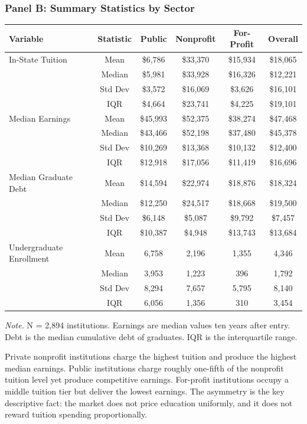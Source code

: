 \begin{table}[htbp]
\subsubsection*{Panel B: Summary Statistics by Sector}
\begin{tabular}{lccccc}
\toprule
\textbf{Variable} & \textbf{Statistic} & \textbf{Public} & \textbf{Nonprofit} & \textbf{For-Profit} & \textbf{Overall} \\
\midrule
In-State Tuition & Mean & \$6,786 & \$33,370 & \$15,934 & \$18,065 \\
 & Median & \$5,981 & \$33,928 & \$16,326 & \$12,221 \\
 & Std Dev & \$3,572 & \$16,069 & \$3,626 & \$16,101 \\
 & IQR & \$4,664 & \$23,741 & \$4,225 & \$19,101 \\
\midrule
Median Earnings & Mean & \$45,993 & \$52,375 & \$38,274 & \$47,468 \\
 & Median & \$43,466 & \$52,198 & \$37,480 & \$45,378 \\
 & Std Dev & \$10,269 & \$13,368 & \$10,132 & \$12,400 \\
 & IQR & \$12,918 & \$17,056 & \$11,419 & \$16,696 \\
\midrule
Median Graduate Debt & Mean & \$14,594 & \$22,974 & \$18,876 & \$18,324 \\
 & Median & \$12,250 & \$24,517 & \$18,668 & \$19,500 \\
 & Std Dev & \$6,148 & \$5,087 & \$9,792 & \$7,457 \\
 & IQR & \$10,387 & \$4,948 & \$13,743 & \$13,684 \\
\midrule
Undergraduate Enrollment & Mean & 6,758 & 2,196 & 1,355 & 4,346 \\
 & Median & 3,953 & 1,223 & 396 & 1,792 \\
 & Std Dev & 8,294 & 7,657 & 5,795 & 8,140 \\
 & IQR & 6,056 & 1,356 & 310 & 3,454 \\
\bottomrule
\end{tabular}
\vspace{6pt}
{\footnotesize \textit{Note.} N = 2,894 institutions. Earnings are median values ten years after entry. Debt is the median cumulative debt of graduates. IQR is the interquartile range.}
\end{table}

Private nonprofit institutions charge the highest tuition and produce the highest median earnings. Public institutions charge roughly one-fifth of the nonprofit tuition level yet produce competitive earnings. For-profit institutions occupy a middle tuition tier but deliver the lowest earnings. The asymmetry is the key descriptive fact: the market does not price education uniformly, and it does not reward tuition spending proportionally.

